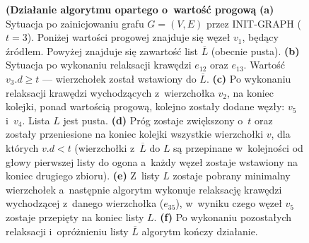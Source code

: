 \begin{figure}[!htbp]
\begin{subfigure}[b]{0.32\textwidth}
		\caption{}
	\end{subfigure}
	\caption{ \textbf{(Działanie algorytmu opartego o~wartość progową} \textbf{(a)} Sytuacja po zainicjowaniu grafu $G = \left( V, E \right)$ przez \textsf{INIT-GRAPH} ($t=3$). Poniżej wartości progowej znajduje się węzeł $v_{1}$, będący źródłem. Powyżej znajduje się zawartość list $\overline{L}$ (obecnie pusta). \textbf{(b)} Sytuacja po wykonaniu relaksacji krawędzi $e_{12}$ oraz $e_{13}$. Wartość $v_{3}.d \geqslant t$ --- wierzchołek został wstawiony do $\overline{L}$. \textbf{(c)} Po wykonaniu relaksacji krawędzi wychodzących z~wierzchołka $v_{2}$, na koniec kolejki, ponad wartością progową, kolejno zostały dodane węzły: $v_{5}$ i~$v_{4}$. Lista $L$ jest pusta. \textbf{(d)} Próg zostaje zwiększony o~$t$ oraz zostały przeniesione na koniec kolejki wszystkie wierzchołki $v$, dla których $v.d < t$ (wierzchołki z~$\overline{L}$ do $L$ są przepinane w~kolejności od głowy pierwszej listy do ogona a~każdy węzeł zostaje wstawiony na koniec drugiego zbioru). \textbf{(e)} Z~listy $L$ zostaje pobrany minimalny wierzchołek a~następnie algorytm wykonuje relaksację krawędzi wychodzącej z~danego wierzchołka ($e_{35}$), w~wyniku czego węzeł $v_{5}$ zostaje przepięty na koniec listy $L$. \textbf{(f)} Po wykonaniu pozostałych relaksacji i~opróżnieniu listy $\overline{L}$ algorytm kończy działanie. } \label{fig:exampleThreshold}
\end{figure}